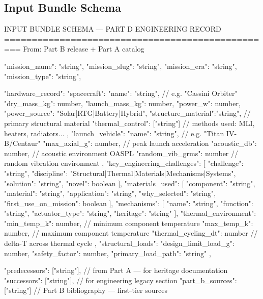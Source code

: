 \documentclass[11pt,letterpaper]{article}
\begin{document}
\subsection{Input Bundle Schema}

\begin{asciibox}
INPUT BUNDLE SCHEMA — PART D ENGINEERING RECORD
=================================================
From: Part B release + Part A catalog

{
  "mission_name":     "string",
  "mission_slug":     "string",
  "mission_era":      "string",
  "mission_type":     "string",

  "hardware_record": {
    "spacecraft": {
      "name":              "string",    // e.g. "Cassini Orbiter"
      "dry_mass_kg":       number,
      "launch_mass_kg":    number,
      "power_w":           number,
      "power_source":      "Solar|RTG|Battery|Hybrid",
      "structure_material":"string",    // primary structural material
      "thermal_control":   ["string"]   // methods used: MLI, heaters, radiators...
    },
    "launch_vehicle": {
      "name":              "string",    // e.g. "Titan IV-B/Centaur"
      "max_axial_g":       number,      // peak launch acceleration
      "acoustic_db":       number,      // acoustic environment OASPL
      "random_vib_grms":   number       // random vibration environment
    },
    "key_engineering_challenges": [
      { "challenge": "string", "discipline": "Structural|Thermal|Materials|Mechanisms|Systems",
        "solution":  "string", "novel": boolean }
    ],
    "materials_used": [
      { "component": "string", "material": "string", "application": "string",
        "why_selected": "string", "first_use_on_mission": boolean }
    ],
    "mechanisms": [
      { "name": "string", "function": "string", "actuator_type": "string",
        "heritage": "string" }
    ],
    "thermal_environment": {
      "min_temp_k": number,    // minimum component temperature
      "max_temp_k": number,    // maximum component temperature
      "thermal_cycling_dt": number  // delta-T across thermal cycle
    },
    "structural_loads": {
      "design_limit_load_g": number,
      "safety_factor": number,
      "primary_load_path": "string"
    }
  },

  "predecessors": ["string"],   // from Part A — for heritage documentation
  "successors":   ["string"],   // for engineering legacy section
  "part_b_sources": ["string"]  // Part B bibliography — first-tier sources
}
\end{asciibox}
\end{document}
